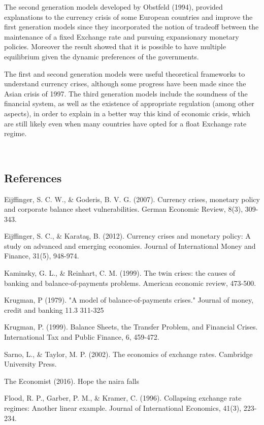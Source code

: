 \documentclass[a4paper,12pt]{article}
\begin{document}
The second generation models developed by Obstfeld (1994), provided explanations to the currency crisis of some European countries and improve the first generation models since they incorporated the notion of tradeoff between the maintenance of a fixed Exchange rate and pursuing expansionary monetary policies. Moreover the result showed that it is possible to have multiple equilibrium given the dynamic preferences of the governments. 

The first and second generation models were useful theoretical frameworks to understand currency crises, although some progress have been made since the Asian crisis of 1997. The third generation models include the soundness of the financial system, as well as the existence of appropriate regulation (among other aspects), in order to explain in a better way this kind of economic crisis, which are still likely even when many countries have opted for a float Exchange rate regime. 


 
\subsection{References}

Eijffinger, S. C. W., & Goderis, B. V. G. (2007). Currency crises, monetary policy and corporate balance sheet vulnerabilities. German Economic Review, 8(3), 309-343.

Eijffinger, S. C., & Karataş, B. (2012). Currency crises and monetary policy: A study on advanced and emerging economies. Journal of International Money and Finance, 31(5), 948-974.

Kaminsky, G. L., & Reinhart, C. M. (1999). The twin crises: the causes of banking and balance-of-payments problems. American economic review, 473-500.

Krugman, P (1979). "A model of balance-of-payments crises." Journal of money, credit and banking 11.3 311-325

Krugman, P. (1999). Balance Sheets, the Transfer Problem, and Financial Crises. International Tax and Public Finance, 6, 459-472.

Sarno, L., & Taylor, M. P. (2002). The economics of exchange rates. Cambridge University Press.

The Economist (2016). Hope the naira falls 

Flood, R. P., Garber, P. M., & Kramer, C. (1996). Collapsing exchange rate regimes: Another linear example. Journal of International Economics, 41(3), 223-234.
\end{document}
